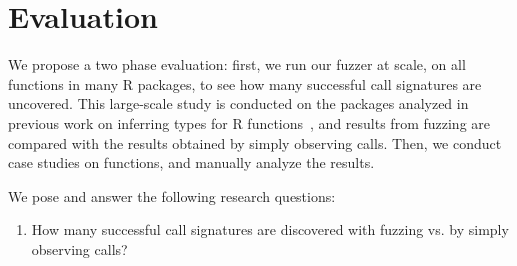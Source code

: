 \section{Evaluation}

We propose a two phase evaluation: first, we run our fuzzer at scale, on all functions in many R packages, to see how many successful call signatures are uncovered.
This large-scale study is conducted on  the packages analyzed in previous work on inferring types for R functions~\cite{turcotte2020designing}, and results from fuzzing are compared with the results obtained by simply observing calls.
Then, we conduct case studies on \numFnsCaseStudy functions, and manually analyze the results.

We pose and answer the following research questions:

\begin{enumerate}
    \item How many successful call signatures are discovered with fuzzing vs. by simply observing calls?
    
\end{enumerate}

